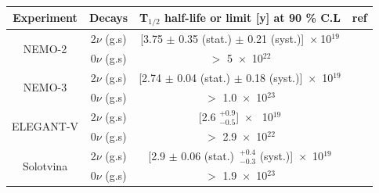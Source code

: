 \documentclass[main.tex]{subfiles}
\begin{document}
\begin{table}[h!]
\begin{center}
\begin{tabular}{c|c|c|c}
\toprule
Experiment & Decays & T$_{\text{1}/\text{2}}$ half-life or limit [y] at 90 \% C.L & ref\\[0.1cm]
\hline

\multirow{2}{*}{NEMO-2} & 2$\nu$ (g.s) & [3.75 $\pm$ 0.35 (stat.) $\pm$ 0.21 (syst.)]~$\times~$10$^{\text{19}}$&  \multirow{2}{*}{\cite{NEMO2:Cd116}}\\[0.1cm]
                        & 0$\nu$ (g.s) & $>$ 5~$\times$~10$^{\text{22}}$ &\\[0.1cm]
                                               
\hline   
\multirow{2}{*}{NEMO-3}  & 2$\nu$ (g.s) & [2.74 $\pm$ 0.04 (stat.) $\pm$ 0.18 (syst.)]~$\times$~10$^{\text{19}}$& \multirow{2}{*}{\cite{Arnold2016bed}}\\[0.1cm]
                        & 0$\nu$ (g.s) & $>$ 1.0~$\times$~10$^{\text{23}}$ &\\[0.1cm]
                    
\hline                        

\multirow{2}{*}{ELEGANT-V}  & 2$\nu$ (g.s) & [2.6 $^{+\text{0.9}}_{-\text{0.5}}$]~$\times$~ 10$^{\text{19}}$& \multirow{2}{*}{\cite{ElegantV-1}}\\[0.1cm]
                           & 0$\nu$ (g.s) & $>$ 2.9~$\times$~10$^{\text{22}}$ &\\[0.1cm]
                        
                        
\hline


                           
                           
\multirow{2}{*}{Solotvina} & 2$\nu$ (g.s) & [2.9 $\pm$ 0.06 (stat.)~$^{+\text{0.4}}_{-\text{0.3}}$ (syst.)]~$\times$~10$^{\text{19}}$& \multirow{2}{*}{\cite{Solotvina}}\\[0.1cm]
                           & 0$\nu$ (g.s) & $>$ 1.9~$\times$~10$^{\text{23}}$ &\\[0.1cm]
                           


\end{tabular}
\end{center}
\end{table}
\end{document}
